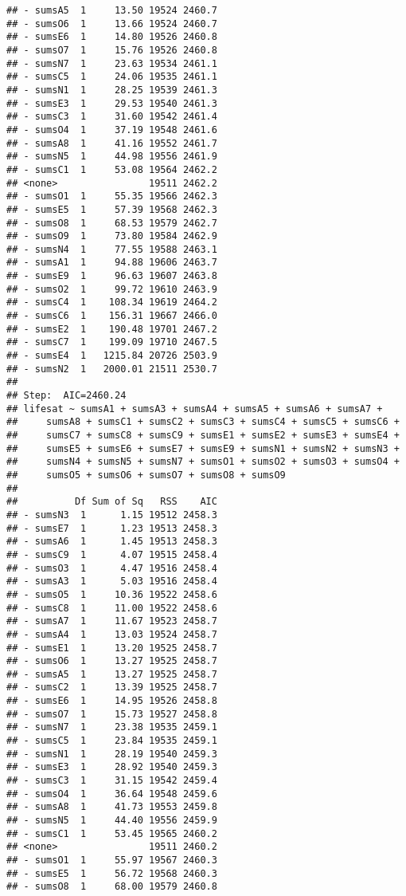 \documentclass[,man,floatsintext]{apa6}
\begin{document}
\begin{verbatim}
## - sumsA5  1     13.50 19524 2460.7
## - sumsO6  1     13.66 19524 2460.7
## - sumsE6  1     14.80 19526 2460.8
## - sumsO7  1     15.76 19526 2460.8
## - sumsN7  1     23.63 19534 2461.1
## - sumsC5  1     24.06 19535 2461.1
## - sumsN1  1     28.25 19539 2461.3
## - sumsE3  1     29.53 19540 2461.3
## - sumsC3  1     31.60 19542 2461.4
## - sumsO4  1     37.19 19548 2461.6
## - sumsA8  1     41.16 19552 2461.7
## - sumsN5  1     44.98 19556 2461.9
## - sumsC1  1     53.08 19564 2462.2
## <none>                19511 2462.2
## - sumsO1  1     55.35 19566 2462.3
## - sumsE5  1     57.39 19568 2462.3
## - sumsO8  1     68.53 19579 2462.7
## - sumsO9  1     73.80 19584 2462.9
## - sumsN4  1     77.55 19588 2463.1
## - sumsA1  1     94.88 19606 2463.7
## - sumsE9  1     96.63 19607 2463.8
## - sumsO2  1     99.72 19610 2463.9
## - sumsC4  1    108.34 19619 2464.2
## - sumsC6  1    156.31 19667 2466.0
## - sumsE2  1    190.48 19701 2467.2
## - sumsC7  1    199.09 19710 2467.5
## - sumsE4  1   1215.84 20726 2503.9
## - sumsN2  1   2000.01 21511 2530.7
## 
## Step:  AIC=2460.24
## lifesat ~ sumsA1 + sumsA3 + sumsA4 + sumsA5 + sumsA6 + sumsA7 + 
##     sumsA8 + sumsC1 + sumsC2 + sumsC3 + sumsC4 + sumsC5 + sumsC6 + 
##     sumsC7 + sumsC8 + sumsC9 + sumsE1 + sumsE2 + sumsE3 + sumsE4 + 
##     sumsE5 + sumsE6 + sumsE7 + sumsE9 + sumsN1 + sumsN2 + sumsN3 + 
##     sumsN4 + sumsN5 + sumsN7 + sumsO1 + sumsO2 + sumsO3 + sumsO4 + 
##     sumsO5 + sumsO6 + sumsO7 + sumsO8 + sumsO9
## 
##          Df Sum of Sq   RSS    AIC
## - sumsN3  1      1.15 19512 2458.3
## - sumsE7  1      1.23 19513 2458.3
## - sumsA6  1      1.45 19513 2458.3
## - sumsC9  1      4.07 19515 2458.4
## - sumsO3  1      4.47 19516 2458.4
## - sumsA3  1      5.03 19516 2458.4
## - sumsO5  1     10.36 19522 2458.6
## - sumsC8  1     11.00 19522 2458.6
## - sumsA7  1     11.67 19523 2458.7
## - sumsA4  1     13.03 19524 2458.7
## - sumsE1  1     13.20 19525 2458.7
## - sumsO6  1     13.27 19525 2458.7
## - sumsA5  1     13.27 19525 2458.7
## - sumsC2  1     13.39 19525 2458.7
## - sumsE6  1     14.95 19526 2458.8
## - sumsO7  1     15.73 19527 2458.8
## - sumsN7  1     23.38 19535 2459.1
## - sumsC5  1     23.84 19535 2459.1
## - sumsN1  1     28.19 19540 2459.3
## - sumsE3  1     28.92 19540 2459.3
## - sumsC3  1     31.15 19542 2459.4
## - sumsO4  1     36.64 19548 2459.6
## - sumsA8  1     41.73 19553 2459.8
## - sumsN5  1     44.40 19556 2459.9
## - sumsC1  1     53.45 19565 2460.2
## <none>                19511 2460.2
## - sumsO1  1     55.97 19567 2460.3
## - sumsE5  1     56.72 19568 2460.3
## - sumsO8  1     68.00 19579 2460.8

\end{verbatim}
\end{document}
